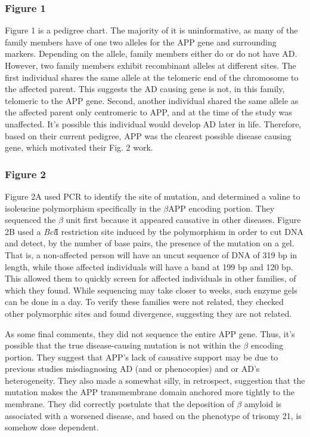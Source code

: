 \subsubsection*{Figure 1} Figure 1 is a pedigree chart. The majority of it is uninformative, as many of the family members have of one two alleles for the APP gene and surrounding markers. Depending on the allele, family members either do or do not have AD. However, two family members exhibit recombinant alleles at different sites. The first individual shares the same allele at the telomeric end of the chromosome to the affected parent. This suggests the AD causing gene is not, in this family, telomeric to the APP gene. Second, another individual shared the same allele as the affected parent only centromeric to APP, and at the time of the study was unaffected. It's possible this individual would develop AD later in life. Therefore, based on their current pedigree, APP was the clearest possible disease causing gene, which motivated their Fig. 2 work. 

\subsubsection*{Figure 2} Figure 2A used PCR to identify the site of mutation, and determined a valine to isoleucine polymorphism specifically in the $\beta$APP encoding portion. They sequenced the $\beta$ unit first because it appeared causative in other diseases. Figure 2B used a \textit{Bcl}I restriction site induced by the polymorphism in order to cut DNA and detect, by the number of base pairs, the presence of the mutation on a gel. That is, a non-affected person will have an uncut sequence of DNA of 319 bp in length, while those affected individuals will have a band at 199 bp and 120 bp. This allowed them to quickly screen for affected individuals in other families, of which they found. While sequencing may take closer to weeks, such enzyme gels can be done in a day. To verify these families were not related, they checked other polymorphic sites and found divergence, suggesting they are not related.\newline

As some final comments, they did not sequence the entire APP gene. Thus, it's possible that the true disease-causing mutation is not within the $\beta$ encoding portion. They suggest that APP's lack of causative support may be due to previous studies misdiagnosing AD (and or phenocopies) and or AD's heterogeneity. They also made a somewhat silly, in retrospect, suggestion that the mutation makes the APP transmembrane domain anchored more tightly to the membrane. They did correctly postulate that the deposition of $\beta$ amyloid is associated with a worsened disease, and based on the phenotype of trisomy 21, is somehow dose dependent. 


